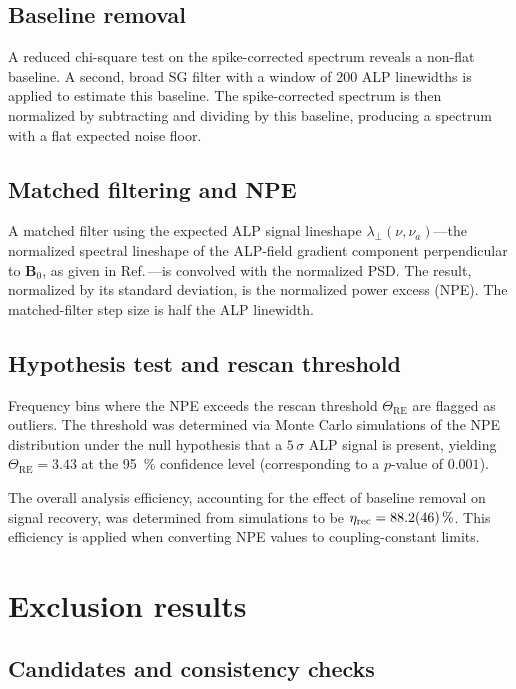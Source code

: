 \subsection{Baseline removal}

A reduced chi-square test on the spike-corrected spectrum reveals a non-flat baseline. A second, broad SG filter with a window of 200 ALP linewidths is applied to estimate this baseline. The spike-corrected spectrum is then normalized by subtracting and dividing by this baseline, producing a spectrum with a flat expected noise floor.

\subsection{Matched filtering and NPE}

A matched filter using the expected ALP signal lineshape $\lambda_\perp(\nu,\nu_a)$---the normalized spectral lineshape of the ALP-field gradient component perpendicular to $\mathbf{B}_0$, as given in Ref.\,\cite{Gramolin2022Feb_SpectralSignatures}---is convolved with the normalized PSD. The result, normalized by its standard deviation, is the normalized power excess (NPE). The matched-filter step size is half the ALP linewidth.

\subsection{Hypothesis test and rescan threshold}

Frequency bins where the NPE exceeds the rescan threshold $\Theta_\mathrm{RE}$ are flagged as outliers. The threshold was determined via Monte Carlo simulations of the NPE distribution under the null hypothesis that a $5\,\sigma$ ALP signal is present, yielding $\Theta_\mathrm{RE} = 3.43$ at the \SI{95}{\%} confidence level (corresponding to a $p$-value of $0.001$).

The overall analysis efficiency, accounting for the effect of baseline removal on signal recovery, was determined from simulations to be $\eta_\mathrm{rec} = \SI{88.2\pm4.6}{\%}$. This efficiency is applied when converting NPE values to coupling-constant limits.


\section{Exclusion results}\label{sec:results:exclusion}

\subsection{Candidates and consistency checks}

